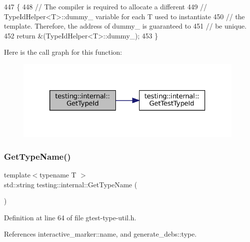 \begin{DoxyCode}
447                    \{
448   \textcolor{comment}{// The compiler is required to allocate a different}
449   \textcolor{comment}{// TypeIdHelper<T>::dummy\_ variable for each T used to instantiate}
450   \textcolor{comment}{// the template.  Therefore, the address of dummy\_ is guaranteed to}
451   \textcolor{comment}{// be unique.}
452   \textcolor{keywordflow}{return} &(TypeIdHelper<T>::dummy\_);
453 \}
\end{DoxyCode}
Here is the call graph for this function\+:
\nopagebreak
\begin{figure}[H]
\begin{center}
\leavevmode
\includegraphics[width=316pt]{namespacetesting_1_1internal_a6b108e56fdc68ea937ffb3759fb55ab0_cgraph}
\end{center}
\end{figure}
\mbox{\label{namespacetesting_1_1internal_a635606b4731f843c86ec8ca51cab83a1}} 
\subsubsection{\texorpdfstring{Get\+Type\+Name()}{GetTypeName()}}
{\footnotesize\ttfamily template$<$typename T $>$ \\
std\+::string testing\+::internal\+::\+Get\+Type\+Name (\begin{DoxyParamCaption}{ }\end{DoxyParamCaption})}



Definition at line 64 of file gtest-\/type-\/util.\+h.



References interactive\+\_\+marker\+::name, and generate\+\_\+debs\+::type.


